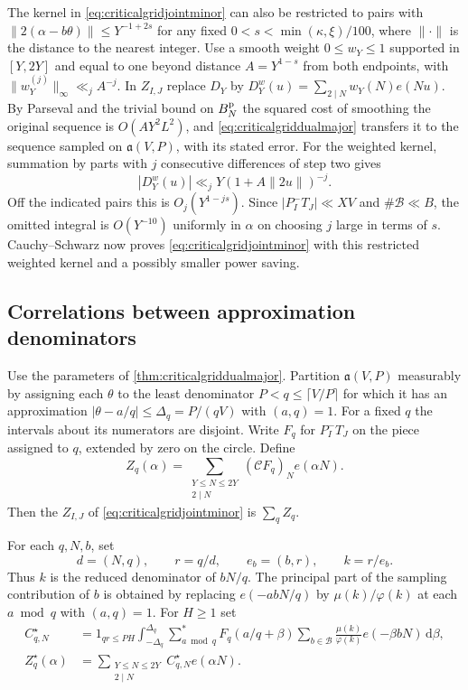 \documentclass[11pt,a4paper]{article}
\numberwithin{equation}{section}
\newcommand{\ud}{\mathrm d}
\begin{document}
The kernel in \cref{eq:criticalgridjointminor} can also be
restricted to pairs with $\|2(\alpha-b\theta)\|\le Y^{-1+2s}$
for any fixed $0<s<\min(\kappa,\xi)/100$, where $\|\cdot\|$
is the distance to the nearest integer. Use a smooth weight
$0\le w_Y\le1$ supported in $[Y,2Y]$ and equal to one beyond
distance $A=Y^{1-s}$ from both endpoints, with
$\|w_Y^{(j)}\|_\infty\ll_j A^{-j}$. In $Z_{I,J}$ replace
$D_Y$ by $D_Y^w(u)=\sum_{2\mid N}w_Y(N)e(Nu)$.
By Parseval and the trivial bound on $B_N^{\rm p}$ the squared
cost of smoothing the original sequence is $O(A Y^2 L^2)$,
and \cref{eq:criticalgriddualmajor} transfers it to the
sequence sampled on $\mathfrak a(V,P)$, with its stated error.
For the weighted kernel, summation by parts with $j$ consecutive
differences of step two gives
\[
 |D_Y^w(u)|\ll_j Y(1+A\|2u\|)^{-j}.
\]
Off the indicated pairs this is $O_j(Y^{1-js})$. Since
$|P_I^-T_J|\ll XV$ and $\#\mathcal B\ll B$, the omitted
integral is $O(Y^{-10})$ uniformly in $\alpha$ on choosing
$j$ large in terms of $s$. Cauchy--Schwarz now proves
\cref{eq:criticalgridjointminor} with this restricted weighted
kernel and a possibly smaller power saving.

\clearpage
\subsection{Correlations between approximation denominators}

Use the parameters of \cref{thm:criticalgriddualmajor}.
Partition $\mathfrak a(V,P)$ measurably by assigning each
$\theta$ to the least denominator $P<q\le\lceil V/P\rceil$
for which it has an approximation
$|\theta-a/q|\le\Delta_q=P/(qV)$ with $(a,q)=1$.
For a fixed $q$ the intervals about its numerators are disjoint.
Write $F_q$ for $P_I^-T_J$ on the piece assigned to $q$,
extended by zero on the circle. Define
\[
 Z_q(\alpha)=
   \sum_{\substack{Y\le N\le2Y\\2\mid N}}
                     (\mathcal C F_q)_N e(\alpha N).
\]
Then the $Z_{I,J}$ of \cref{eq:criticalgridjointminor}
is $\sum_q Z_q$.

For each $q,N,b$, set
\[
 d=(N,q),\qquad r=q/d,\qquad e_b=(b,r),\qquad k=r/e_b.
\]
Thus $k$ is the reduced denominator of $bN/q$.
The principal part of the sampling contribution of $b$ is
obtained by replacing $e(-abN/q)$ by $\mu(k)/\varphi(k)$
at each $a\bmod q$ with $(a,q)=1$. For $H\ge1$ set
\begin{align*}
 C_{q,N}^{\star}
    &=1_{qr\le PH}\int_{-\Delta_q}^{\Delta_q}
       \sum_{a\bmod q}^{*} F_q(a/q+\beta)
       \sum_{b\in\mathcal B}
          \frac{\mu(k)}{\varphi(k)}e(-\beta bN)\,\ud\beta,\\
 Z_q^{\star}(\alpha)
    &=\sum_{\substack{Y\le N\le2Y\\2\mid N}}
                            C_{q,N}^{\star}e(\alpha N).
\end{align*}
\end{document}
